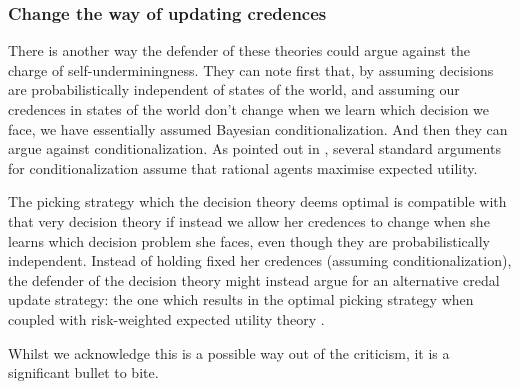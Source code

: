 \documentclass[a4paper]{article}
\newcommand{\todoinfo}[2][]{\todo[inline,{#1}]{#2}}
\renewcommand{\color}[1]{}
\newenvironment{colored}[1]{\leavevmode\color{#1}}{}
\newenvironment{CCM rewritten}
{\begingroup\color{blue}} %
{\endgroup}              %
\begin{document}




	\subsubsection{Change the way of updating credences}

There is another way the defender of these theories could argue against the charge of self-underminingness. They can note first that, by assuming decisions are probabilistically independent of states of the world, and assuming our credences in states of the world don't change when we learn which decision we face, we have essentially assumed Bayesian conditionalization. And then they can argue against conditionalization. As pointed out in \citet[16]{campbellmoore2020arae}, several standard arguments for conditionalization assume that rational agents maximise expected utility.

The picking strategy which the decision theory deems optimal is compatible with that very decision theory if instead we allow her credences to change when she learns which decision problem she faces, even though they are probabilistically independent. Instead of holding fixed her credences (assuming conditionalization), the defender of the decision theory might instead argue for an alternative credal update strategy: the one which results in the optimal picking strategy when coupled with risk-weighted expected utility theory \citep[see also][]{campbellmoore2022aurs,brown1976ceu}.

Whilst we acknowledge this is a possible way out of the criticism, it is a significant bullet to bite. 





\end{document}
